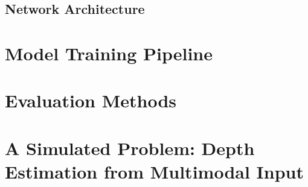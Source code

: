 \subsection{Network Architecture}
\label{network_architectures}



\section{Model Training Pipeline}



\section{Evaluation Methods}



\section{A Simulated Problem: Depth Estimation from Multimodal Input}



